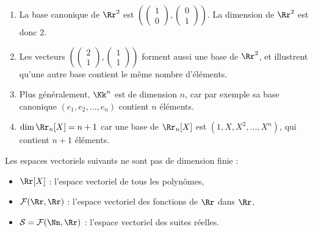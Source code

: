 \documentclass[class=report,crop=false]{standalone}
\begin{document}
\begin{exemple}
\sauteligne
\begin{enumerate}
  \item La base canonique de $\Rr^2$ est
$\left(
\left(\begin{smallmatrix} 1\\0 \end{smallmatrix}\right),
\left(\begin{smallmatrix} 0\\1 \end{smallmatrix}\right)
\right)$. La dimension de $\Rr^2$ est donc $2$.

  \item Les vecteurs $\left(
  \left(\begin{smallmatrix}2\\1\end{smallmatrix}\right),
  \left(\begin{smallmatrix}1\\1\end{smallmatrix}\right) \right)$
  forment aussi une base de $\Rr^2$, et illustrent qu'une autre base contient
  le même nombre d'éléments.

  \item Plus généralement, $\Kk^n$ est de dimension $n$, car par exemple sa base canonique
  $(e_1,e_2, \ldots ,e_n)$ contient $n$ éléments.

  \item $\dim \Rr_n[X] = n+1$ car une base de $\Rr_n[X]$ est
  $(1,X,X^2,\ldots,X^n)$, qui contient $n+1$ éléments.
\end{enumerate}

\end{exemple}


\begin{exemple}
Les espaces vectoriels suivants ne sont pas de dimension finie :
\begin{itemize}
  \item $\Rr[X]$ : l'espace vectoriel de tous les polynômes,
  \item $\mathcal{F}(\Rr,\Rr)$ : l'espace vectoriel des fonctions de $\Rr$ dans $\Rr$,
  \item $\mathcal{S} = \mathcal{F}(\Nn, \Rr)$ : l'espace vectoriel des suites réelles.
\end{itemize}
\end{exemple}
\end{document}
